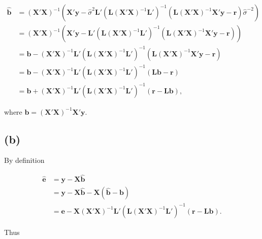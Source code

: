 \documentclass[
]{article}
\begin{document}
\begin{align*}
\hat{\boldsymbol{b}} &= (\boldsymbol{X}'\boldsymbol{X})^{-1}(\boldsymbol{X}'\boldsymbol{y}-\hat{\sigma}^2\boldsymbol{L}'(\boldsymbol{L}(\boldsymbol{X}'\boldsymbol{X})^{-1}\boldsymbol{L}')^{-1}(\boldsymbol{L}(\boldsymbol{X}'\boldsymbol{X})^{-1}\boldsymbol{X}'\boldsymbol{y}-\boldsymbol{r})\hat{\sigma}^{-2}) \\
&= (\boldsymbol{X}'\boldsymbol{X})^{-1}(\boldsymbol{X}'\boldsymbol{y}-\boldsymbol{L}'(\boldsymbol{L}(\boldsymbol{X}'\boldsymbol{X})^{-1}\boldsymbol{L}')^{-1}(\boldsymbol{L}(\boldsymbol{X}'\boldsymbol{X})^{-1}\boldsymbol{X}'\boldsymbol{y}-\boldsymbol{r})) \\
&= \boldsymbol{b}-(\boldsymbol{X}'\boldsymbol{X})^{-1}\boldsymbol{L}'(\boldsymbol{L}(\boldsymbol{X}'\boldsymbol{X})^{-1}\boldsymbol{L}')^{-1}(\boldsymbol{L}(\boldsymbol{X}'\boldsymbol{X})^{-1}\boldsymbol{X}'\boldsymbol{y}-\boldsymbol{r}) \\
&= \boldsymbol{b}-(\boldsymbol{X}'\boldsymbol{X})^{-1}\boldsymbol{L}'(\boldsymbol{L}(\boldsymbol{X}'\boldsymbol{X})^{-1}\boldsymbol{L}')^{-1}(\boldsymbol{L}\boldsymbol{b}-\boldsymbol{r}) \\
&= \boldsymbol{b}+(\boldsymbol{X}'\boldsymbol{X})^{-1}\boldsymbol{L}'(\boldsymbol{L}(\boldsymbol{X}'\boldsymbol{X})^{-1}\boldsymbol{L}')^{-1}(\boldsymbol{r}-\boldsymbol{L}\boldsymbol{b}),
\end{align*}

where
\(\boldsymbol{b} = (\boldsymbol{X}'\boldsymbol{X})^{-1}\boldsymbol{X}'\boldsymbol{y}\).

\hypertarget{b-1}{%
\subsection{(b)}\label{b-1}}

By definition

\begin{align*}
\hat{\boldsymbol{e}} &= \boldsymbol{y} - \boldsymbol{X}\hat{\boldsymbol{b}} \\
&= \boldsymbol{y} - \boldsymbol{X}\hat{\boldsymbol{b}} - \boldsymbol{X}(\hat{\boldsymbol{b}} - \boldsymbol{b}) \\
&= \boldsymbol{e} - \boldsymbol{X}(\boldsymbol{X}'\boldsymbol{X})^{-1}\boldsymbol{L}'(\boldsymbol{L}(\boldsymbol{X}'\boldsymbol{X})^{-1}\boldsymbol{L}')^{-1}(\boldsymbol{r}-\boldsymbol{L}\boldsymbol{b}).
\end{align*}

Thus
\end{document}
